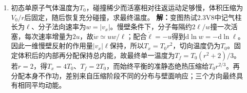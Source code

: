 \documentclass[UTF8,fontset=fandol,a4paper,11pt]{ctexart}
\begin{document}
\begin{enumerate}
\item 初态单原子气体温度为$T_0$，碰撞稀少而活塞相对往返运动足够慢，体积压缩为$V_0/r$后固定，随后恢复充分碰撞，求最终温度。
\textbf{解：}变图热试2.3V8中记气柱长为$\ell$、分子法向速率为$w=|v_x|$。慢壁条件下，分子每隔约$2\ell/w$撞一次活塞，每次速率增量为$2u$，故$\dot w\simeq uw/\ell$；配合$\dot\ell=-u$得到$\mathrm d\ln w=-\mathrm d\ln\ell$。因此一维慢壁反射的作用量$|v_x|\ell$保持，所以$T_x=T_0r^2$，切向温度仍为$T_0$。固定体积后的内部再分配保持总内能，故最终单一温度为$T_f=T_0(r^2+2)/3$。若$r=2$，得$T_x=4T_0$、$T_f=2T_0$，而始终平衡的准静态绝热压缩给$T_0r^{2/3}$。再分配本身不作功，差别来自压缩阶段不同的分布与壁面响应；三个方向最终具有相同平均动能。
\begin{center}\begin{minipage}{.98\linewidth}\centering
{}
\end{minipage}
\end{center}
\end{enumerate}
\end{document}
